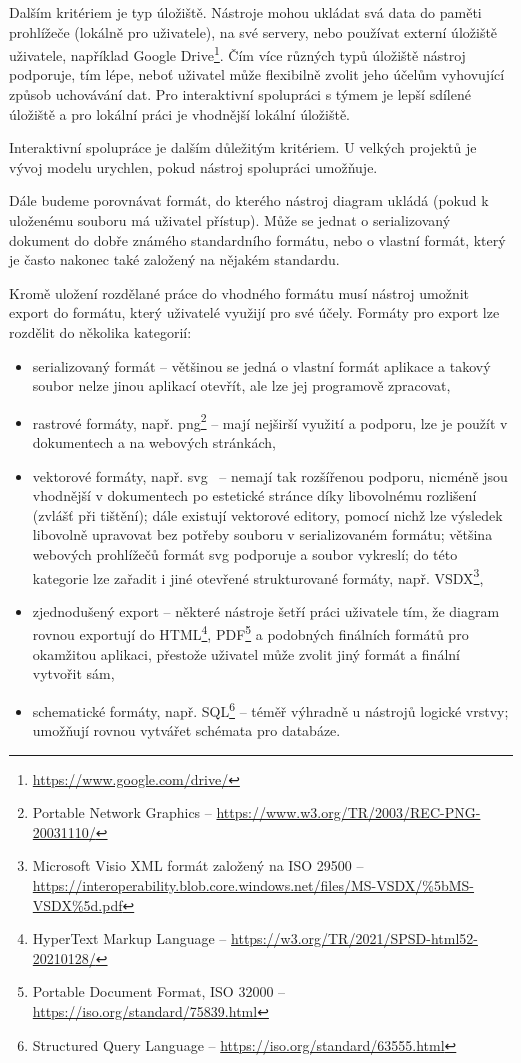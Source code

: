 Dalším kritériem je typ úložiště.
Nástroje mohou ukládat svá data do paměti prohlížeče (lokálně pro uživatele), na své servery, nebo používat externí úložiště uživatele, například Google Drive\footnote{\url{https://www.google.com/drive/}}.
Čím více různých typů úložiště nástroj podporuje, tím lépe, neboť uživatel může flexibilně zvolit jeho účelům vyhovující způsob uchovávání dat.
Pro interaktivní spolupráci s týmem je lepší sdílené úložiště a pro lokální práci je vhodnější lokální úložiště.

Interaktivní spolupráce je dalším důležitým kritériem.
U velkých projektů je vývoj modelu urychlen, pokud nástroj spolupráci umožňuje.

Dále budeme porovnávat formát, do kterého nástroj diagram ukládá (pokud k uloženému souboru má uživatel přístup).
Může se jednat o serializovaný dokument do dobře známého standardního formátu, nebo o vlastní formát, který je často nakonec také založený na nějakém standardu.

Kromě uložení rozdělané práce do vhodného formátu musí nástroj umožnit export do formátu, který uživatelé využijí pro své účely.
Formáty pro export lze rozdělit do několika kategorií:
\begin{itemize}
  \item serializovaný formát -- většinou se jedná o vlastní formát aplikace a takový soubor nelze jinou aplikací otevřít, ale lze jej programově zpracovat,
  \item rastrové formáty, např. \acrfull{png}\footnote{Portable Network Graphics -- \url{https://www.w3.org/TR/2003/REC-PNG-20031110/}} -- mají nejširší využití a podporu, lze je použít v dokumentech a na webových stránkách,
  \item vektorové formáty, např. \acrfull{svg}~\cite{brinza_svg_2018} -- nemají tak rozšířenou podporu, nicméně jsou vhodnější v dokumentech po estetické stránce díky libovolnému rozlišení (zvlášť při tištění);
        dále existují vektorové editory, pomocí nichž lze výsledek libovolně upravovat bez potřeby souboru v serializovaném formátu;
        většina webových prohlížečů formát \acrshort{svg} podporuje a soubor vykreslí;
        do této kategorie lze zařadit i jiné otevřené strukturované formáty, např. VSDX\footnote{Microsoft Visio XML formát založený na ISO 29500 -- \url{https://interoperability.blob.core.windows.net/files/MS-VSDX/\%5bMS-VSDX\%5d.pdf}},
  \item zjednodušený export -- některé nástroje šetří práci uživatele tím, že diagram rovnou exportují do HTML\footnote{HyperText Markup Language -- \url{https://w3.org/TR/2021/SPSD-html52-20210128/}}, PDF\footnote{Portable Document Format, ISO 32000 -- \url{https://iso.org/standard/75839.html}} a podobných finálních formátů pro okamžitou aplikaci, přestože uživatel může zvolit jiný formát a finální vytvořit sám,
  \item schematické formáty, např. SQL\footnote{Structured Query Language -- \url{https://iso.org/standard/63555.html}} -- téměř výhradně u nástrojů lo\-gic\-ké vrst\-vy; umožňují rovnou vytvářet schémata pro databáze.
\end{itemize}

